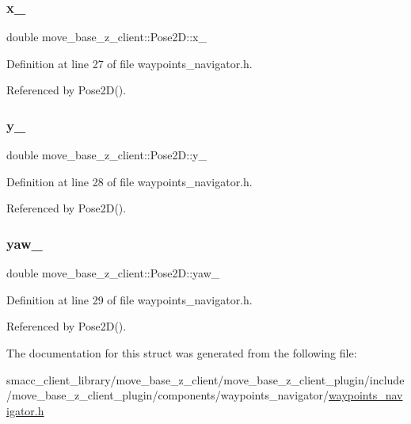 \subsubsection{\texorpdfstring{x\+\_\+}{x\_}}
{\footnotesize\ttfamily double move\+\_\+base\+\_\+z\+\_\+client\+::\+Pose2\+D\+::x\+\_\+}



Definition at line 27 of file waypoints\+\_\+navigator.\+h.



Referenced by Pose2\+D().

\mbox{\label{structmove__base__z__client_1_1Pose2D_a10e59f372c758bffb00bfaaca43ec1fc}} 
\subsubsection{\texorpdfstring{y\+\_\+}{y\_}}
{\footnotesize\ttfamily double move\+\_\+base\+\_\+z\+\_\+client\+::\+Pose2\+D\+::y\+\_\+}



Definition at line 28 of file waypoints\+\_\+navigator.\+h.



Referenced by Pose2\+D().

\mbox{\label{structmove__base__z__client_1_1Pose2D_a75fda2f20515d0acdb83d33017e6c97e}} 
\subsubsection{\texorpdfstring{yaw\+\_\+}{yaw\_}}
{\footnotesize\ttfamily double move\+\_\+base\+\_\+z\+\_\+client\+::\+Pose2\+D\+::yaw\+\_\+}



Definition at line 29 of file waypoints\+\_\+navigator.\+h.



Referenced by Pose2\+D().



The documentation for this struct was generated from the following file\+:\begin{DoxyCompactItemize}
\item 
smacc\+\_\+client\+\_\+library/move\+\_\+base\+\_\+z\+\_\+client/move\+\_\+base\+\_\+z\+\_\+client\+\_\+plugin/include/move\+\_\+base\+\_\+z\+\_\+client\+\_\+plugin/components/waypoints\+\_\+navigator/\hyperlink{waypoints__navigator_8h}{waypoints\+\_\+navigator.\+h}\end{DoxyCompactItemize}
